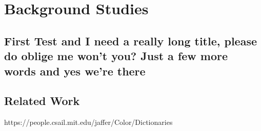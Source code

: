 
\chapter{Background Studies}
\label{section:litreview}
\section{First Test and I need a really long title, please do oblige me won't you? Just a few more words and yes we're there}



\section{Related Work}

https://people.csail.mit.edu/jaffer/Color/Dictionaries
